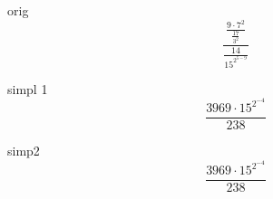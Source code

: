 \documentclass[a4paper, 12pt]{article}
\begin{document}
                          
orig \[  \frac { \frac {{{9} \cdot {{7} ^ {2}}}} { \frac {{17}} {{{3} ^ {2}}}}} { \frac {{14}} {{{15} ^ {{2} ^ {{5} - {9}}}}}} \]

simpl 1 \[  \frac {{{3969} \cdot {{15} ^ {{2} ^ {-4}}}}} {{238}} \]

simp2 \[  \frac {{{3969} \cdot {{15} ^ {{2} ^ {-4}}}}} {{238}} \]
\end{document}
